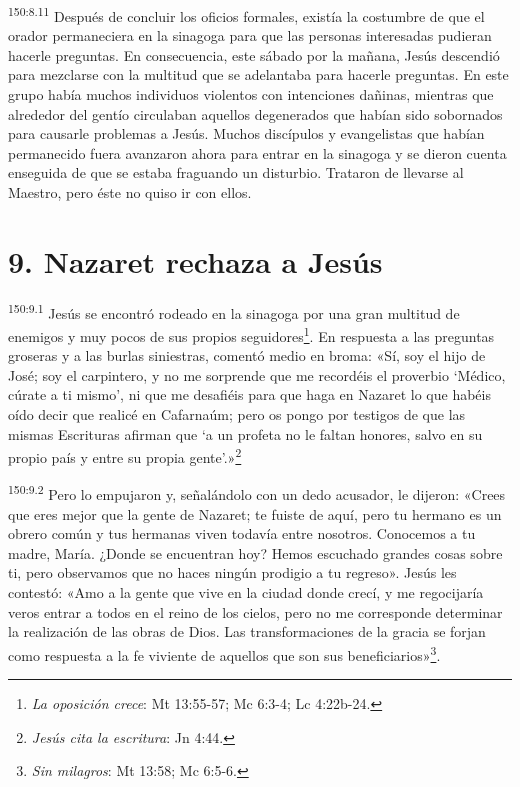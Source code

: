 \par
\textsuperscript{150:8.11} Después de concluir los oficios formales, existía la costumbre de que el orador permaneciera en la sinagoga para que las personas interesadas pudieran hacerle preguntas. En consecuencia, este sábado por la mañana, Jesús descendió para mezclarse con la multitud que se adelantaba para hacerle preguntas. En este grupo había muchos individuos violentos con intenciones dañinas, mientras que alrededor del gentío circulaban aquellos degenerados que habían sido sobornados para causarle problemas a Jesús. Muchos discípulos y evangelistas que habían permanecido fuera avanzaron ahora para entrar en la sinagoga y se dieron cuenta enseguida de que se estaba fraguando un disturbio. Trataron de llevarse al Maestro, pero éste no quiso ir con ellos.

\section*{9. Nazaret rechaza a Jesús}
\par
\textsuperscript{150:9.1} Jesús se encontró rodeado en la sinagoga por una gran multitud de enemigos y muy pocos de sus propios seguidores\footnote{\textit{La oposición crece}: Mt 13:55-57; Mc 6:3-4; Lc 4:22b-24.}. En respuesta a las preguntas groseras y a las burlas siniestras, comentó medio en broma: «Sí, soy el hijo de José; soy el carpintero, y no me sorprende que me recordéis el proverbio `Médico, cúrate a ti mismo', ni que me desafiéis para que haga en Nazaret lo que habéis oído decir que realicé en Cafarnaúm; pero os pongo por testigos de que las mismas Escrituras afirman que `a un profeta no le faltan honores, salvo en su propio país y entre su propia gente'.»\footnote{\textit{Jesús cita la escritura}: Jn 4:44.}

\par
\textsuperscript{150:9.2} Pero lo empujaron y, señalándolo con un dedo acusador, le dijeron: «Crees que eres mejor que la gente de Nazaret; te fuiste de aquí, pero tu hermano es un obrero común y tus hermanas viven todavía entre nosotros. Conocemos a tu madre, María. ¿Donde se encuentran hoy? Hemos escuchado grandes cosas sobre ti, pero observamos que no haces ningún prodigio a tu regreso». Jesús les contestó: «Amo a la gente que vive en la ciudad donde crecí, y me regocijaría veros entrar a todos en el reino de los cielos, pero no me corresponde determinar la realización de las obras de Dios. Las transformaciones de la gracia se forjan como respuesta a la fe viviente de aquellos que son sus beneficiarios»\footnote{\textit{Sin milagros}: Mt 13:58; Mc 6:5-6.}.

